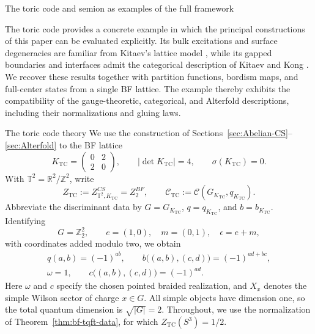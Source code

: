 \documentclass[12pt]{amsart}
\makeatletter
\renewcommand\section{\@startsection{section}{1}%
  \z@{.7\linespacing\@plus\linespacing}{.5\linespacing}%
  {\normalfont\bfseries\centering}}
\renewcommand\subsection{\@startsection{subsection}{2}%
  \z@{.5\linespacing\@plus.7\linespacing}{-.5em}%
  {\normalfont\bfseries}}
\numberwithin{equation}{section}
\theoremstyle{definition}
\makeatother
\begin{document}
\section{The toric code and semion as examples of the full framework}
\label{subsec:toric-code-defects}

The toric code provides a concrete example in which the principal constructions of this paper can be evaluated explicitly. Its bulk excitations and surface degeneracies are familiar from Kitaev's lattice model \cite{kitaev2003anyons}, while its gapped boundaries and interfaces admit the categorical description of Kitaev and Kong \cite{kitaev2012models}. We recover these results together with partition functions, bordism maps, and full-center states from a single BF lattice. The example thereby exhibits the compatibility of the gauge-theoretic, categorical, and Alterfold descriptions, including their normalizations and gluing laws.

\subsection{The toric code theory}
We use the construction of Sections~\ref{sec:Abelian-CS}--\ref{sec:Alterfold} to the BF lattice
$$
K_{\mathrm{TC}}=
\begin{pmatrix}
0&2\\
2&0
\end{pmatrix},
\qquad
|\det K_{\mathrm{TC}}|=4,
\qquad
\sigma(K_{\mathrm{TC}})=0.
$$
With $\mathbb T^2=\mathbb R^2/\mathbb Z^2$, write
$$
Z_{\mathrm{TC}}
:=Z^{CS}_{\mathbb T^2,K_{\mathrm{TC}}}
=Z^{BF}_2,
\qquad
\mathcal C_{\mathrm{TC}}
:=\mathcal C(G_{K_{\mathrm{TC}}},q_{K_{\mathrm{TC}}}).
$$
Abbreviate the discriminant data by
$G=G_{K_{\mathrm{TC}}}$, $q=q_{K_{\mathrm{TC}}}$, and
$b=b_{K_{\mathrm{TC}}}$. Identifying
$$
G=\mathbb Z_2^2,
\qquad
e=(1,0),\quad m=(0,1),\quad \epsilon=e+m,
$$
with coordinates added modulo two, we obtain
\begin{equation}
\label{eq:gauge-toric-data}
\begin{gathered}
q(a,b)=(-1)^{ab},
\qquad
b\bigl((a,b),(c,d)\bigr)=(-1)^{ad+bc},
\\
\omega=1,
\qquad
c\bigl((a,b),(c,d)\bigr)=(-1)^{ad}.
\end{gathered}
\end{equation}
Here $\omega$ and $c$ specify the chosen pointed braided realization,
and $X_x$ denotes the simple Wilson sector of charge $x\in G$.
All simple objects have dimension one, so the total quantum dimension
is $\sqrt{|G|}=2$. Throughout, we use the normalization of
Theorem~\ref{thm:bf-tqft-data}, for which
$Z_{\mathrm{TC}}(S^3)=1/2$.
\end{document}
